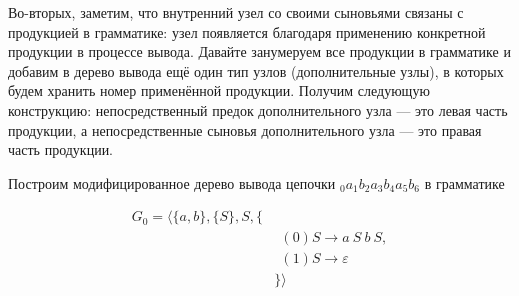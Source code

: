 Во-вторых, заметим, что внутренний узел со своими сыновьями связаны с продукцией в грамматике: узел появляется благодаря применению конкретной продукции в процессе вывода.
Давайте занумеруем все продукции в грамматике и добавим в дерево вывода ещё один тип узлов (дополнительные узлы), в которых будем хранить номер применённой продукции.
Получим следующую конструкцию: непосредственный предок дополнительного узла --- это левая часть продукции, а непосредственные сыновья дополнительного узла --- это правая часть продукции.

\begin{example}
  Построим модифицированное дерево вывода цепочки $_0a_1b_2a_3b_4a_5b_6$ в грамматике

  \begin{align*}
  G_0 = \langle \{a,b\}, \{S\},  S, \{ & \\
       & \ \ (0) S \to a \ S \ b \ S, \\
       & \ \ (1) S \to \varepsilon \\
  & \}  \rangle
  \end{align*}



\begin{center}
\end{center}
\end{example}
